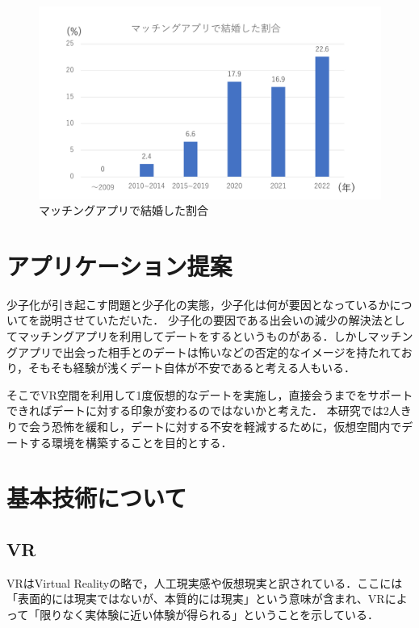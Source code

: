 \documentclass[12pt,a4j,titlepage]{ltjsarticle}
\begin{document}
\begin{figure}[h]
\begin{center}
\includegraphics[keepaspectratio, scale=0.5]{mattinnguwariai.pdf}
\end{center}
 \caption{マッチングアプリで結婚した割合}
 \label{fig:mattingu}
\end{figure}
\clearpage

\section{アプリケーション提案}
少子化が引き起こす問題と少子化の実態，少子化は何が要因となっているかについてを説明させていただいた．
少子化の要因である出会いの減少の解決法としてマッチングアプリを利用してデートをするというものがある．しかしマッチングアプリで出会った相手とのデートは怖いなどの否定的なイメージを持たれており，そもそも経験が浅くデート自体が不安であると考える人もいる．

そこでVR空間を利用して1度仮想的なデートを実施し，直接会うまでをサポートできればデートに対する印象が変わるのではないかと考えた．
本研究では2人きりで会う恐怖を緩和し，デートに対する不安を軽減するために，仮想空間内でデートする環境を構築することを目的とする．

\clearpage
\section{基本技術について}
\subsection{VR}
VRはVirtual Realityの略で，人工現実感や仮想現実と訳されている．ここには「表面的には現実ではないが、本質的には現実」という意味が含まれ、VRによって「限りなく実体験に近い体験が得られる」ということを示している．
\end{document}
